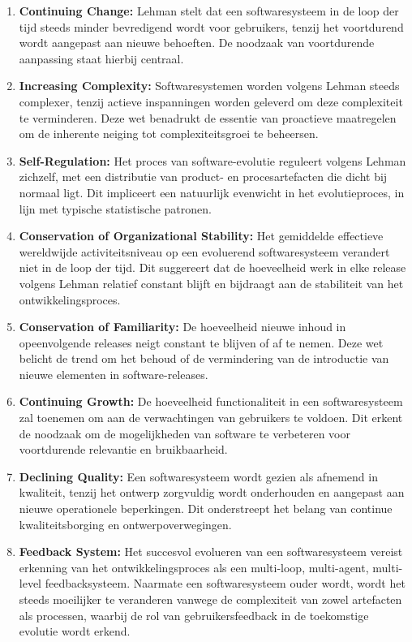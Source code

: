 \begin{enumerate}
	\item \textbf{Continuing Change:} Lehman stelt dat een softwaresysteem in de loop der tijd steeds minder bevredigend wordt voor gebruikers, tenzij het voortdurend wordt aangepast aan nieuwe behoeften. De noodzaak van voortdurende aanpassing staat hierbij centraal.
	
	\item \textbf{Increasing Complexity:} Softwaresystemen worden volgens Lehman steeds complexer, tenzij actieve inspanningen worden geleverd om deze complexiteit te verminderen. Deze wet benadrukt de essentie van proactieve maatregelen om de inherente neiging tot complexiteitsgroei te beheersen.
	
	\item \textbf{Self-Regulation:} Het proces van software-evolutie reguleert volgens Lehman zichzelf, met een distributie van product- en procesartefacten die dicht bij normaal ligt. Dit impliceert een natuurlijk evenwicht in het evolutieproces, in lijn met typische statistische patronen.
	
	\item \textbf{Conservation of Organizational Stability:} Het gemiddelde effectieve wereldwijde activiteitsniveau op een evoluerend softwaresysteem verandert niet in de loop der tijd. Dit suggereert dat de hoeveelheid werk in elke release volgens Lehman relatief constant blijft en bijdraagt aan de stabiliteit van het ontwikkelingsproces.
	
	\item \textbf{Conservation of Familiarity:} De hoeveelheid nieuwe inhoud in opeenvolgende releases neigt constant te blijven of af te nemen. Deze wet belicht de trend om het behoud of de vermindering van de introductie van nieuwe elementen in software-releases.
	
	\item \textbf{Continuing Growth:} De hoeveelheid functionaliteit in een softwaresysteem zal toenemen om aan de verwachtingen van gebruikers te voldoen. Dit erkent de noodzaak om de mogelijkheden van software te verbeteren voor voortdurende relevantie en bruikbaarheid.
	
	\item \textbf{Declining Quality:} Een softwaresysteem wordt gezien als afnemend in kwaliteit, tenzij het ontwerp zorgvuldig wordt onderhouden en aangepast aan nieuwe operationele beperkingen. Dit onderstreept het belang van continue kwaliteitsborging en ontwerpoverwegingen.
	
	\item \textbf{Feedback System:} Het succesvol evolueren van een softwaresysteem vereist erkenning van het ontwikkelingsproces als een multi-loop, multi-agent, multi-level feedbacksysteem. Naarmate een softwaresysteem ouder wordt, wordt het steeds moeilijker te veranderen vanwege de complexiteit van zowel artefacten als processen, waarbij de rol van gebruikersfeedback in de toekomstige evolutie wordt erkend. ~\autocite{Godfrey2013}
\end{enumerate}

